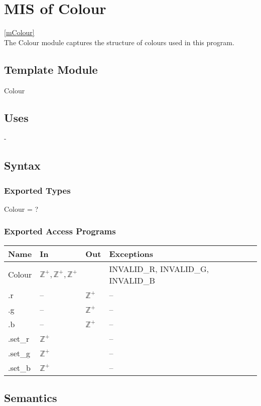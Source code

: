 \documentclass[12pt, titlepage]{article}
\begin{document}
\newpage

\section{MIS of Colour} \ref{mColour} \\
The Colour module captures the structure of colours used in this program.

\subsection{Template Module}
Colour

\subsection{Uses} -

\subsection{Syntax}
\subsubsection{Exported Types}
Colour = ?

\subsubsection{Exported Access Programs}
\begin{center}
	\begin{tabular}{p{4cm} p{2cm} p{2cm} p{4cm}}
		\hline
		\textbf{Name} & \textbf{In} & \textbf{Out} & \textbf{Exceptions} \\
		\hline
		Colour & $\mathbb{Z}^+,\mathbb{Z}^+,\mathbb{Z}^+$ & & INVALID\_R, 
		INVALID\_G, INVALID\_B \\
		.r & -- & $\mathbb{Z}^+$ & -- \\
		.g & -- & $\mathbb{Z}^+$ & -- \\		
		.b & -- & $\mathbb{Z}^+$ & -- \\		%
		.set\_r & $\mathbb{Z}^+$ & & -- \\
		.set\_g & $\mathbb{Z}^+$ & & -- \\		
		.set\_b & $\mathbb{Z}^+$ & & -- \\		%
		\hline
	\end{tabular}
\end{center}

\subsection{Semantics}
\end{document}
